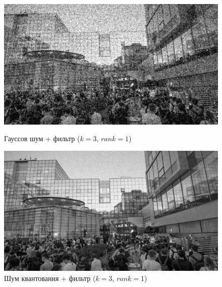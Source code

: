 \documentclass[a4paper]{article}
\begin{document}
\begin{figure}[H]
    \begin{minipage}{0.49\textwidth}
        \centering \includegraphics[width=\textwidth]{images/3_nonlinear_filters/gaussian - rang (k=3, rank=1).jpg}
        \caption{Гауссов шум + фильтр ($k = 3$, $rank = 1$)}
    \end{minipage}\hfill
    \begin{minipage}{0.49\textwidth}
        \centering \includegraphics[width=\textwidth]{images/3_nonlinear_filters/poisson - rang (k=3, rank=1).jpg}
        \caption{Шум квантования + фильтр ($k = 3$, $rank = 1$)}
    \end{minipage}
\end{figure}
\end{document}
